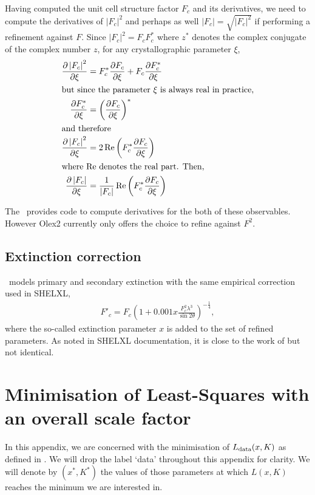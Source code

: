 \documentclass[11pt]{article}
\newcommand{\re}{\operatorname{Re}}
\newcommand{\modulus}[1]{\left| #1 \right|}
\newcommand{\partialder}[2]{\frac{\partial #1}{\partial #2}}
\begin{document}
Having computed the unit cell structure factor $F_c$ and its derivatives, we need to compute the derivatives of $\modulus{F_c}^2$ and perhaps as well $\modulus{F_c} = \sqrt{\modulus{F_c}^2}$ if performing a refinement against $F$. Since $\modulus{F_c}^2 = F_c F_c^*$ where $z^*$ denotes the complex conjugate of the complex number $z$, for any crystallographic parameter $\xi$,
\begin{align}
\partialder{\modulus{F_c}^2}{\xi} &= F_c^* \partialder{F_c}{\xi} + F_c \partialder{F_c^*}{\xi} \nonumber \\
\intertext{but since the parameter $\xi$ is always real in practice,}
\partialder{F_c^*}{\xi} &= \left( \partialder{F_c}{\xi} \right)^* \\
\intertext{and therefore}
\partialder{\modulus{F_c}^2}{\xi} &= 2\re\left( F_c^* \partialder{F_c}{\xi}\right) \\
\intertext{where $\re$ denotes the real part. Then,}
\partialder{\modulus{F_c}}{\xi} &= \frac{1}{\modulus{F_c}} \re\left( F_c^* \partialder{F_c}{\xi}\right)
\end{align}

The \smtbx\ provides code to compute derivatives for the both of these observables. However Olex2 currently only offers the choice to refine against $F^2$.

\subsection{Extinction correction}
\olexrefine\ models primary and secondary extinction with the same empirical correction used in SHELXL,
\begin{align}
F'_c = F_c\left(1+0.001 x \frac{F_c^{2}\lambda^3}{\sin 2\theta}\right)^{-\frac{1}{4}},
\end{align}
where the so-called extinction parameter $x$ is added to the set of refined parameters. As noted in SHELXL documentation, it is close to the work of  but not identical.


\section{Minimisation of Least-Squares with an overall scale factor}
\label{appendix:leastsquaresminimisation}
In this appendix, we are concerned with the minimisation of $L_{\text{data}}(x, K)$ as defined in . We will drop the label `data' throughout this appendix for clarity. We will denote by $(x^*, K^*)$ the values of those parameters at which $L(x,K)$ reaches the minimum we are interested in.
\end{document}
